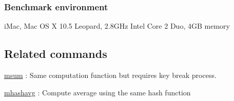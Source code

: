 \subsubsection*{Benchmark environment}

iMac, Mac OS X 10.5 Leopard, 2.8GHz Intel Core 2 Duo, 4GB memory

\subsection*{Related commands}
\hyperref[sect:msum] {msum} : Same computation function but requires key break process. 

\hyperref[sect:mhashavg]{mhashavg} : Compute average using the same hash function



%
